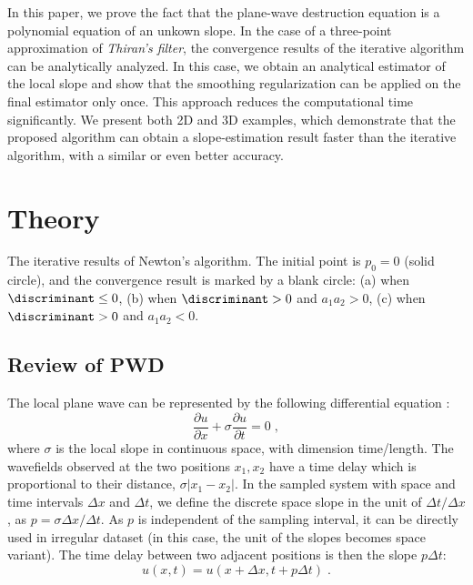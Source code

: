 In this paper, we prove the fact that
the plane-wave destruction equation is
a polynomial equation of an unkown slope.
In the case of a three-point approximation of \textit{Thiran's filter},
the convergence results
of the iterative algorithm can be analytically analyzed.
In this case, we obtain an analytical estimator of the local slope
and show that the smoothing regularization can be applied on 
the final estimator only once.
This approach reduces the computational time significantly.
We present both 2D and 3D examples, 
which demonstrate that the proposed algorithm can 
obtain a slope-estimation result faster than the iterative algorithm,
with a similar or even better accuracy.

\section{Theory}


{
The iterative results of Newton's algorithm.
The initial point is $p_0=0$ (solid circle), 
and the convergence result is marked by a blank circle:
(a) when $\discriminant\leq 0$,
(b) when $\discriminant>0$ and $a_1a_2>0$,
(c) when $\discriminant>0$ and $a_1a_2<0$.
}


\subsection{Review of PWD}
The local plane wave can be represented by the following differential equation
\cite[]{claerbout1992earth}:
\begin{equation}
\frac{\partial u}{\partial x}+\sigma\frac{\partial u}{\partial t} =0\;,
\end{equation}
where $\sigma$ is the local slope in continuous space, 
with dimension time/length.
The wavefields observed at the two positions $x_1,x_2$ have a time delay
which is proportional to their distance, $\sigma|x_1-x_2|$.
In the sampled system with space and time intervals $\Delta x$ and $\Delta t$,
we define the discrete space slope in the unit of $\Delta t/\Delta x$,
as $p=\sigma\Delta x/\Delta t$.
As $p$ is independent of the sampling interval, 
it can be directly used in irregular dataset
(in this case, the unit of the slopes becomes space variant).
The time delay between two adjacent positions is then the slope $p\Delta t$:
\begin{equation}
u(x,t)=u(x+\Delta x, t+p\Delta t)\;.
\end{equation}

